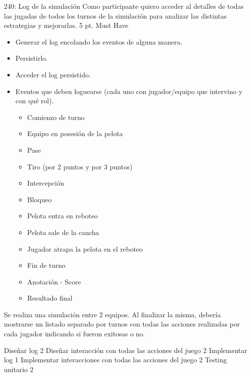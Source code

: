 \vspace{1cm}


\sprintstory
{240: Log de la simulación}
{Como participante quiero acceder al detalles de todas las jugadas de todos los turnos de la simulación para analizar las distintas estrategias y mejorarlas.}
{5 pt.}
{Must Have}
{\begin{itemize}
	\item Generar el log encolando los eventos de alguna manera.
	\item Persistirlo.
	\item Acceder el log persistido.
	\item Eventos que deben loguearse (cada uno con jugador/equipo que intervino y con qué rol).
		\begin{itemize}
			\item Comienzo de turno
			\item Equipo en posesión de la pelota
			\item Pase
			\item Tiro (por 2 puntos y por 3 puntos)
			\item Intercepción
			\item Bloqueo
			\item Pelota entra en reboteo
			\item Pelota sale de la cancha
			\item Jugador atrapa la pelota en el reboteo
			\item Fin de turno
			\item Anotación - Score
			\item Resultado final
		\end{itemize}
\end{itemize}}
{Se realiza una simulación entre 2 equipos. Al finalizar la misma, debería mostrarse un listado separado por turnos con todas las acciones realizadas por cada jugador indicando si fueron exitosas o no.}

\begin{taskstable}
 \task
 {Diseñar log}
 {2}
 \task
 {Diseñar interacción con todas las acciones del juego}
 {2}
 \task
 {Implementar log}
 {1}
 \task
 {Implementar interacciones con todas las acciones del juego}
 {2}
 \task
 {Testing unitario}
 {2}
\end{taskstable}






